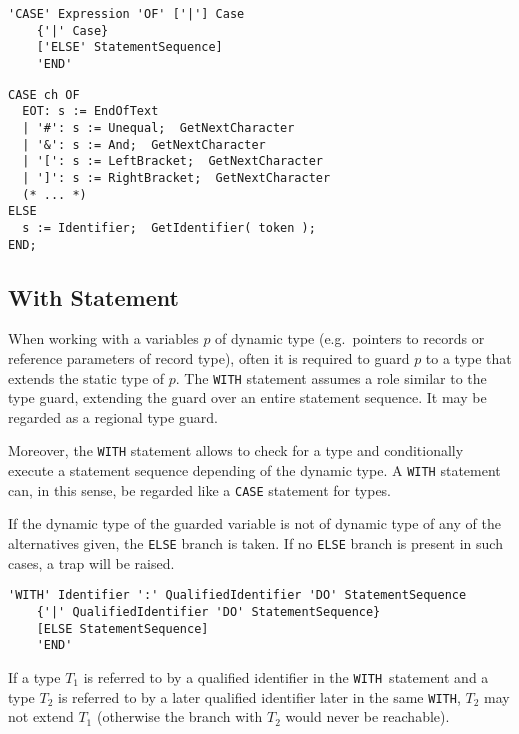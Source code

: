 \documentclass[a4wide,11pt]{article}
\newcommand{\WITH}{\lstinline"WITH"}
\begin{document}
\begin{lstlisting}[style=ebnf]
'CASE' Expression 'OF' ['|'] Case
    {'|' Case}
    ['ELSE' StatementSequence]
    'END'
\end{lstlisting}

\begin{annotation}
\begin{lstlisting}[style=example]
CASE ch OF
  EOT: s := EndOfText
  | '#': s := Unequal;  GetNextCharacter
  | '&': s := And;  GetNextCharacter
  | '[': s := LeftBracket;  GetNextCharacter
  | ']': s := RightBracket;  GetNextCharacter
  (* ... *)
ELSE
  s := Identifier;  GetIdentifier( token );
END;
\end{lstlisting}
\end{annotation}

\subsection{With Statement}
When working with a variables $p$ of dynamic type (e.g.\ pointers to records or reference parameters of record type), often it is required to guard $p$ to a type that extends the static type of $p$.
The \lstinline"WITH" statement assumes a role similar to the type guard, extending the guard over an entire statement sequence.
It may be regarded as a regional type guard.

Moreover, the \lstinline"WITH" statement allows to check for a type and conditionally execute a statement sequence depending of the dynamic type.
A \lstinline"WITH" statement can, in this sense, be regarded like a \lstinline"CASE" statement for types.

If the dynamic type of the guarded variable is not of dynamic type of any of the alternatives given, the \lstinline"ELSE" branch is taken.
If no \lstinline"ELSE" branch is present in such cases, a trap will be raised.

\begin{lstlisting}[style=ebnf]
'WITH' Identifier ':' QualifiedIdentifier 'DO' StatementSequence
    {'|' QualifiedIdentifier 'DO' StatementSequence}
    [ELSE StatementSequence]
    'END'
\end{lstlisting}

If a type $T_1$ is referred to by a qualified identifier in the \WITH\ statement and a type $T_2$ is referred to by a later qualified identifier later in the same \WITH, $T_2$ may not extend $T_1$ (otherwise the branch with $T_2$ would never be reachable).
\end{document}
